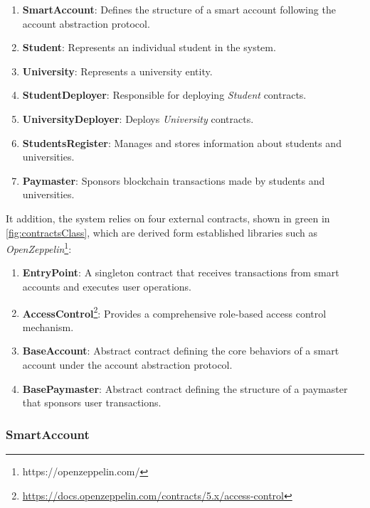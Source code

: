 \begin{enumerate}
    \item \textbf{SmartAccount}: Defines the structure of a smart account following the account abstraction protocol.
    \item \textbf{Student}: Represents an individual student in the system.
    \item \textbf{University}: Represents a university entity.
    \item \textbf{StudentDeployer}: Responsible for deploying \textit{Student} contracts.
    \item \textbf{UniversityDeployer}: Deploys \textit{University} contracts.
    \item \textbf{StudentsRegister}: Manages and stores information about students and universities.
    \item \textbf{Paymaster}: Sponsors blockchain transactions made by students and universities.
\end{enumerate}
It addition, the system relies on four external contracts, shown in green in \cref{fig:contractsClass}, which are derived form established libraries such as \textit{OpenZeppelin}\footnote{https://openzeppelin.com/}:
\begin{enumerate}
    \item \textbf{EntryPoint}: A singleton contract that receives transactions from smart accounts and executes user operations.
    \item \textbf{AccessControl}\footnote{\url{https://docs.openzeppelin.com/contracts/5.x/access-control}}: Provides a comprehensive role-based access control mechanism.
    \item \textbf{BaseAccount}: Abstract contract defining the core behaviors of a smart account under the account abstraction protocol.
    \item \textbf{BasePaymaster}: Abstract contract defining the structure of a paymaster that sponsors user transactions.
\end{enumerate}

\subsubsection{SmartAccount}

